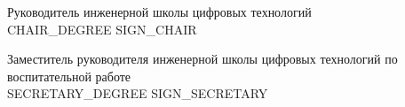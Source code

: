 \documentclass[a4paper,12pt]{article}
\begin{document}
Руководитель инженерной школы цифровых технологий \\
{{CHAIR_DEGREE}} \hspace{2cm} \underline{\hspace{4cm}} \hspace{0.5cm} {{SIGN_CHAIR}} \\
\vspace{1.5em}

Заместитель руководителя инженерной школы цифровых технологий по воспитательной работе \\
{{SECRETARY_DEGREE}} \hspace{2cm} \underline{\hspace{4cm}} \hspace{0.5cm} {{SIGN_SECRETARY}}
\end{document}
